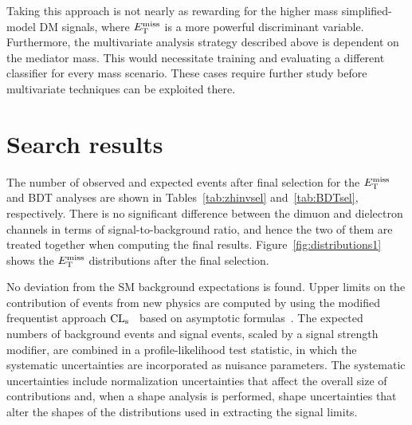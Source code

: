 Taking this approach is not nearly as rewarding for the higher mass simplified-model DM signals, where $E_\mathrm{T}^{\mathrm{miss}}$ is a more powerful discriminant variable.
Furthermore, the multivariate analysis strategy described above is dependent on the mediator mass.
This would necessitate training and evaluating a different classifier for every mass scenario.
These cases require further study before multivariate techniques can be exploited there.

\section{Search results}
\label{sec:dmresults}
The number of observed and expected events after final selection for the $E_\mathrm{T}^{\mathrm{miss}}$ and BDT analyses are shown in Tables~\ref{tab:zhinvsel} and~\ref{tab:BDTsel}, respectively. 
There is no significant difference between the dimuon and dielectron channels 
in terms of signal-to-background ratio, and hence the two of them 
are treated together when computing the final results. 
Figure~\ref{fig:distributions1} shows the $E_\mathrm{T}^{\mathrm{miss}}$
distributions after the final selection.

No deviation from the SM background expectations is found.
Upper limits on the contribution of events from new physics are
computed by using the modified frequentist approach
$\text{CL}_\text{s}$~\cite{Read1,junkcls} based on asymptotic
formulas~\cite{Cowan:2010js}. 
The expected numbers of background events and signal events, scaled by
a signal strength modifier, are combined in a profile-likelihood test 
statistic, in which the systematic uncertainties are incorporated as
nuisance parameters. 
The systematic uncertainties include normalization uncertainties that
affect the overall size of contributions and, when a shape analysis is
performed, shape uncertainties that alter the shapes of the
distributions used in extracting the signal limits. 


